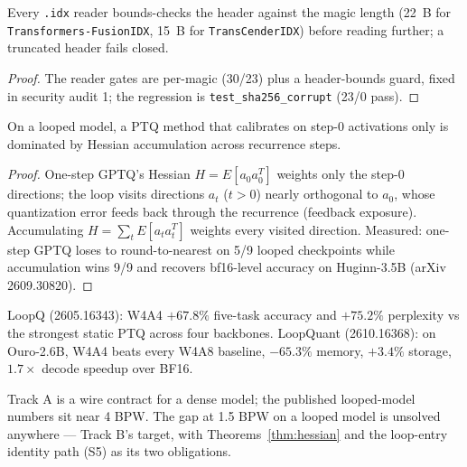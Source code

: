 \begin{theorem}\label{thm:reads}
Every \texttt{.idx} reader bounds-checks the header against the magic length (22~B for
\texttt{Transformers-FusionIDX}, 15~B for \texttt{TransCenderIDX}) before reading further; a
truncated header fails closed.
\end{theorem}

\begin{proof}
The reader gates are per-magic (30/23) plus a header-bounds guard, fixed in security audit 1;
the regression is \texttt{test\_sha256\_corrupt} (23/0 pass).
\end{proof}

\begin{theorem}\label{thm:hessian}
On a looped model, a PTQ method that calibrates on step-0 activations only is dominated by
Hessian accumulation across recurrence steps.
\end{theorem}

\begin{proof}
One-step GPTQ's Hessian $H = E[a_0 a_0^T]$ weights only the step-0 directions; the loop visits
directions $a_t$ ($t > 0$) nearly orthogonal to $a_0$, whose quantization error feeds back
through the recurrence (feedback exposure). Accumulating $H = \sum_t E[a_t a_t^T]$ weights
every visited direction. Measured: one-step GPTQ loses to round-to-nearest on 5/9 looped
checkpoints while accumulation wins 9/9 and recovers bf16-level accuracy on Huginn-3.5B
(arXiv 2609.30820).
\end{proof}

\begin{fact}\label{fact:bench}
LoopQ (2605.16343): W4A4 $+67.8\%$ five-task accuracy and $+75.2\%$ perplexity vs the strongest
static PTQ across four backbones. LoopQuant (2610.16368): on Ouro-2.6B, W4A4 beats every W4A8
baseline, $-65.3\%$ memory, $+3.4\%$ storage, $1.7\times$ decode speedup over BF16.
\end{fact}

\begin{remark}\label{rem:thesis}
Track A is a wire contract for a dense model; the published looped-model numbers sit near 4
BPW. The gap at 1.5 BPW on a looped model is unsolved anywhere --- Track B's target, with
Theorems~\ref{thm:hessian} and the loop-entry identity path (S5) as its two obligations.
\end{remark}
